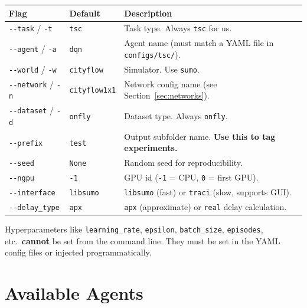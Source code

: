 \documentclass[11pt,a4paper]{article}
\begin{document}
\begin{center}
\begin{longtable}{llp{7cm}}
\toprule
\textbf{Flag} & \textbf{Default} & \textbf{Description} \\
\midrule
\endhead
\texttt{-{}-task} / \texttt{-t}       & \texttt{tsc}       & Task type. Always \texttt{tsc} for us. \\
\texttt{-{}-agent} / \texttt{-a}      & \texttt{dqn}       & Agent name (must match a YAML file in \texttt{configs/tsc/}). \\
\texttt{-{}-world} / \texttt{-w}      & \texttt{cityflow}  & Simulator. Use \texttt{sumo}. \\
\texttt{-{}-network} / \texttt{-n}    & \texttt{cityflow1x1} & Network config name (see Section~\ref{sec:networks}). \\
\texttt{-{}-dataset} / \texttt{-d}    & \texttt{onfly}     & Dataset type. Always \texttt{onfly}. \\
\texttt{-{}-prefix}                    & \texttt{test}      & Output subfolder name. \textbf{Use this to tag experiments.} \\
\texttt{-{}-seed}                      & \texttt{None}      & Random seed for reproducibility. \\
\texttt{-{}-ngpu}                      & \texttt{-1}        & GPU id (\texttt{-1} = CPU, \texttt{0} = first GPU). \\
\texttt{-{}-interface}                 & \texttt{libsumo}   & \texttt{libsumo} (fast) or \texttt{traci} (slow, supports GUI). \\
\texttt{-{}-delay\_type}              & \texttt{apx}       & \texttt{apx} (approximate) or \texttt{real} delay calculation. \\
\bottomrule
\end{longtable}
\end{center}

\begin{warningbox}
Hyperparameters like \texttt{learning\_rate}, \texttt{epsilon}, \texttt{batch\_size}, \texttt{episodes}, etc.\ \textbf{cannot} be set from the command line.
They must be set in the YAML config files or injected programmatically.
\end{warningbox}

\section{Available Agents}
\end{document}
